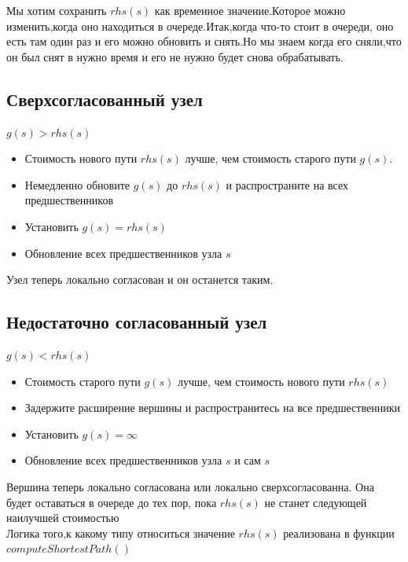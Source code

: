 \documentclass[12pt]{article}
\begin{document}
Мы хотим сохранить $rhs(s)$ как временное значение.Которое можно изменить,когда оно находиться в очереде.Итак,когда что-то стоит в очереди, оно есть там один раз и его можно обновить и снять.Но мы знаем когда его сняли,что он был снят в нужно время и его не нужно будет снова обрабатывать.
\hypertarget{b8}{\subsection*{Сверхсогласованный узел}}
\begin{center}
          $g(s)>rhs(s)$
\end{center}
\begin{itemize}
    \item Стоимость нового пути $rhs(s)$ лучше, чем стоимость старого пути $g(s)$.
    \item Немедленно обновите $g(s)$ до $rhs(s)$ и распространите на всех предшественников
    \item Установить $g(s) = rhs(s)$
    \item Обновление всех предшественников узла $s$
\end{itemize}
Узел теперь локально согласован и он останется таким.
\hypertarget{b9}{\subsection*{Недостаточно согласованный узел}}
\begin{center}
          $g(s)<rhs(s)$
\end{center}
\begin{itemize}
    \item Стоимость старого пути $g(s)$ лучше, чем стоимость нового пути $rhs(s)$
    \item Задержите расширение вершины и распространитесь на все предшественники
    \item Установить $g(s) = \infty$
    \item Обновление всех предшественников узла $s$ и сам $s$
\end{itemize}
Вершина теперь локально согласована или локально сверхсогласованна. Она будет оставаться в
очереде до тех пор, пока $rhs(s)$ не станет следующей наилучшей стоимостью\\
Логика того,к какому типу относиться значение $rhs(s)$ реализована в функции $computeShortestPath()$
\end{document}
